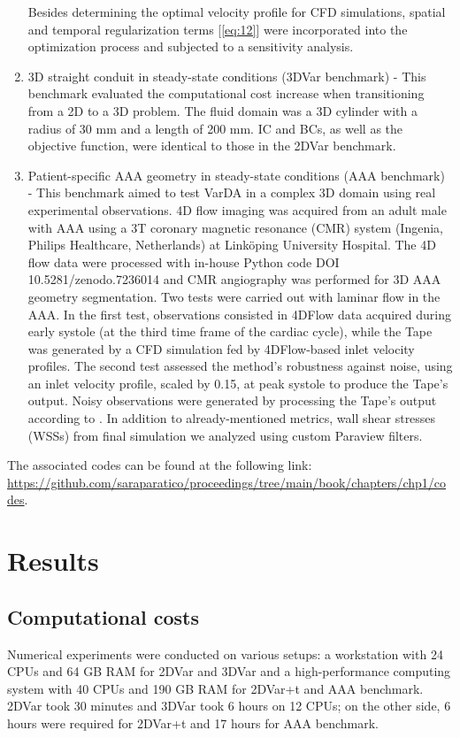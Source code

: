 \begin{enumerate}
Besides determining the optimal velocity profile for CFD simulations, spatial and temporal regularization terms [\cref{eq:12}] were incorporated into the optimization process and subjected to a sensitivity analysis.\\
    \item 3D straight conduit in steady-state conditions (3DVar benchmark) - This benchmark evaluated the computational cost increase when transitioning from a 2D to a 3D problem. The fluid domain was a 3D cylinder with a radius of 30 mm and a length of 200 mm. IC and BCs, as well as the objective function, were identical to those in the 2DVar benchmark.\\
    \item Patient-specific AAA geometry in steady-state conditions (AAA benchmark) - This benchmark aimed to test VarDA in a complex 3D domain using real experimental observations. 4D flow imaging was acquired from an adult male with AAA using a 3T coronary magnetic resonance (CMR) system (Ingenia, Philips Healthcare, Netherlands) at Linköping University Hospital. The 4D flow data were processed with in-house Python code DOI 10.5281/zenodo.7236014 \cite{Saitta2024} and CMR angiography was performed for 3D AAA geometry segmentation.
Two tests were carried out with laminar flow in the AAA. In the first test, observations consisted in 4DFlow data acquired during early systole (at the third time frame of the cardiac cycle), while the Tape was generated by a CFD simulation fed by 4DFlow-based inlet velocity profiles. The second test assessed the method's robustness against noise, using an inlet velocity profile, scaled by 0.15, at peak systole to produce the Tape's output. Noisy observations were generated by processing the Tape's output according to \cite{Saitta2024}.
In addition to already-mentioned metrics, wall shear stresses (WSSs) from final simulation we analyzed using custom Paraview filters.
\end{enumerate}

The associated codes can be found at the following link:
\url{https://github.com/saraparatico/proceedings/tree/main/book/chapters/chp1/codes}.

\section*{Results}
\label{sec:Results}
\label{ch:chapter_three}

\subsection*{Computational costs}
Numerical experiments were conducted on various setups: a workstation with 24 CPUs and 64 GB RAM for 2DVar and 3DVar and a high-performance computing system with 40 CPUs and 190 GB RAM for 2DVar+t and AAA benchmark. 2DVar took 30 minutes and 3DVar took 6 hours on 12 CPUs; on the other side, 6 hours were required for 2DVar+t and 17 hours for AAA benchmark.



